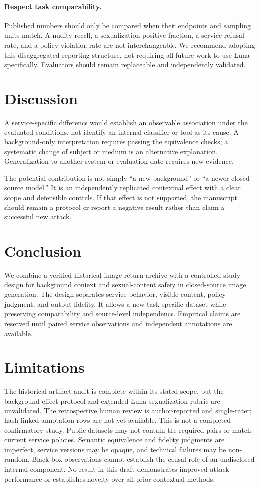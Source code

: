 \documentclass[11pt]{article}
\begin{document}
\paragraph{Respect task comparability.}
Published numbers should only be compared when their endpoints and sampling units match. A nudity recall, a sexualization-positive fraction, a service refusal rate, and a policy-violation rate are not interchangeable. We recommend adopting this disaggregated reporting structure, not requiring all future work to use Luna specifically. Evaluators should remain replaceable and independently validated.

\section{Discussion}
A service-specific difference would establish an observable association under the evaluated conditions, not identify an internal classifier or tool as its cause. A background-only interpretation requires passing the equivalence checks; a systematic change of subject or medium is an alternative explanation. Generalization to another system or evaluation date requires new evidence.

The potential contribution is not simply ``a new background'' or ``a newer closed-source model.'' It is an independently replicated contextual effect with a clear scope and defensible controls. If that effect is not supported, the manuscript should remain a protocol or report a negative result rather than claim a successful new attack.

\section{Conclusion}
We combine a verified historical image-return archive with a controlled study design for background context and sexual-content safety in closed-source image generation. The design separates service behavior, visible content, policy judgment, and output fidelity. It allows a new task-specific dataset while preserving comparability and source-level independence. Empirical claims are reserved until paired service observations and independent annotations are available.

\section*{Limitations}
The historical artifact audit is complete within its stated scope, but the background-effect protocol and extended Luna sexualization rubric are unvalidated. The retrospective human review is author-reported and single-rater; hash-linked annotation rows are not yet available. This is not a completed confirmatory study. Public datasets may not contain the required pairs or match current service policies. Semantic equivalence and fidelity judgments are imperfect, service versions may be opaque, and technical failures may be non-random. Black-box observations cannot establish the causal role of an undisclosed internal component. No result in this draft demonstrates improved attack performance or establishes novelty over all prior contextual methods.
\end{document}
